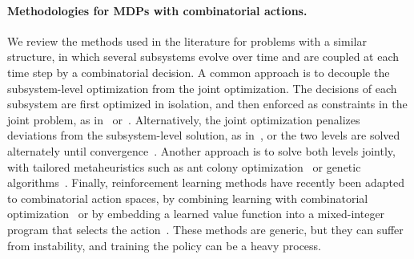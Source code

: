 \documentclass{article}
\begin{document}
\paragraph{Methodologies for MDPs with combinatorial actions.}

We review the methods used in the literature for problems with a similar structure, in which several subsystems
evolve over time and are coupled at each time step by a combinatorial decision. A common approach is to decouple the
subsystem-level optimization from the joint optimization. The decisions of each subsystem are first optimized in
isolation, and then enforced as constraints in the joint problem, as in~\cite{Kingsman2020} or~\cite{Mankowska2014}. 
Alternatively, the joint optimization penalizes deviations from the subsystem-level solution, as in~\cite{Irawan2017, lopezsantana2023}, or the two levels are solved
alternately until convergence~\cite{LopezSantana2016}. Another approach is
to solve both levels jointly, with tailored metaheuristics such as ant colony optimization~\cite{allal2021} or genetic
algorithms~\cite{Camci2015}. Finally, reinforcement learning methods have recently been adapted to combinatorial action
spaces, by combining learning with combinatorial optimization~\cite{Hoppe2025SRL} or by embedding a learned value
function into a mixed-integer program that selects the action~\cite{xu2025combinatorial, delarue2020reinforcement}.
These methods are generic, but they can suffer from instability, and training the policy can be a heavy process.
\end{document}
